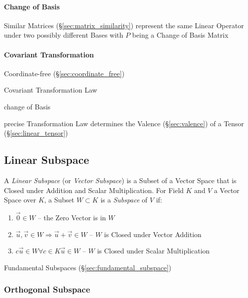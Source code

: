\paragraph{Change of Basis}\label{sec:change_of_basis}\hfill

Similar Matrices (\S\ref{sec:matrix_similarity}) represent the same Linear
Operator under two possibly different Bases with $P$ being a Change of Basis
Matrix



\paragraph{Covariant Transformation}\label{sec:covariant_transformation}\hfill

Coordinate-free (\S\ref{sec:coordinate_free})

Covariant Transformation Law

change of Basis

precise Transformation Law determines the Valence
(\S\ref{sec:valence}) of a Tensor (\S\ref{sec:linear_tensor})



\subsection{Linear Subspace}\label{sec:linear_subspace}

A \emph{Linear Subspace} (or \emph{Vector Subspace}) is a Subset of a Vector
Space that is Closed under Addition and Scalar Multiplication. For Field $K$
and $V$ a Vector Space over $K$, a Subset $W \subset K$ is a \emph{Subspace} of
$V$ if:
\begin{enumerate}
  \item $\vec{0} \in W$ -- the Zero Vector is in $W$
  \item $\vec{u}, \vec{v} \in W \Rightarrow \vec{u} + \vec{v} \in W$
    -- $W$ is Closed under Vector Addition
  \item $c\vec{u} \in W \forall c \in K \vec{u} \in W$
    -- $W$ is Closed under Scalar Multiplication
\end{enumerate}

\fist Fundamental Subspaces (\S\ref{sec:fundamental_subspace})



\subsubsection{Orthogonal Subspace}\label{sec:orthogonal_subspace}

